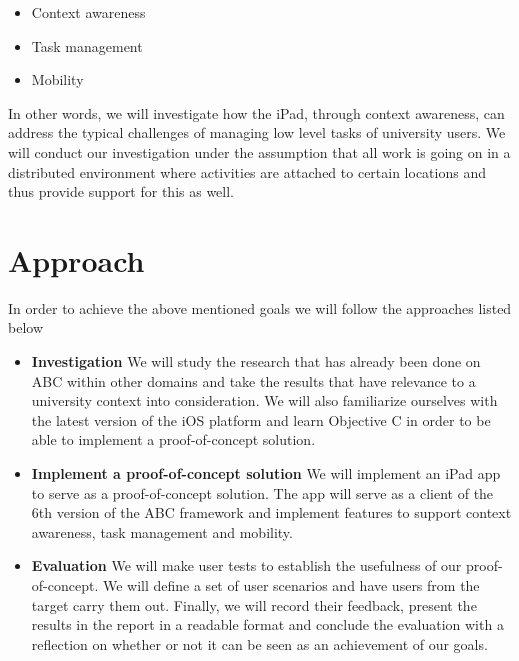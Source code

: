 \begin{itemize}
  \item Context awareness
  \item Task management
  \item Mobility
\end{itemize}

In other words, we will investigate how the iPad, through context awareness, can address the typical challenges of managing low level tasks of university users. We will conduct our investigation under the assumption that all work is going on in a distributed environment where activities are attached to certain locations and thus provide support for this as well.

\section{Approach}
In order to achieve the above mentioned goals we will follow the approaches listed below

\begin{itemize}
  \item \textbf{Investigation} \newline
        We will study the research that has already been done on ABC within other domains and take the results that have relevance to a university context into consideration. We will also familiarize ourselves with the latest version of the iOS platform and learn Objective C in order to be able to implement a proof-of-concept solution.
  \item \textbf{Implement a proof-of-concept solution} \newline
        We will implement an iPad app to serve as a proof-of-concept solution. The app will serve as a client of the 6th version of the ABC framework and implement features to support context awareness, task management and mobility.
  \item \textbf{Evaluation} \newline
        We will make user tests to establish the usefulness of our proof-of-concept. We will define a set of user scenarios and have users from the target carry them out. Finally, we will record their feedback, present the results in the report in a readable format and conclude the evaluation with a reflection on whether or not it can be seen as an achievement of our goals.
\end{itemize}

\newpage


